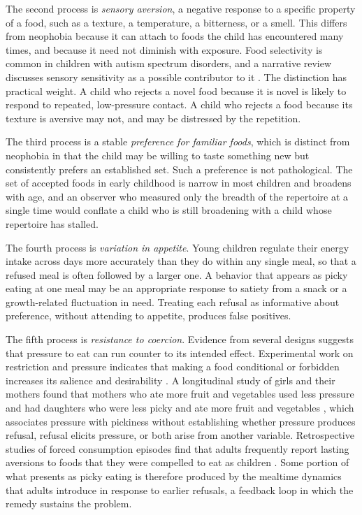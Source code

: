 \documentclass[11pt]{article}
\theoremstyle{remark}
\begin{document}
The second process is \emph{sensory aversion}, a negative response to a specific property of a food, such as a texture, a temperature, a bitterness, or a smell. This differs from neophobia because it can attach to foods the child has encountered many times, and because it need not diminish with exposure. Food selectivity is common in children with autism spectrum disorders, and a narrative review discusses sensory sensitivity as a possible contributor to it \citep{cermak2010food}. The distinction has practical weight. A child who rejects a novel food because it is novel is likely to respond to repeated, low-pressure contact. A child who rejects a food because its texture is aversive may not, and may be distressed by the repetition.

The third process is a stable \emph{preference for familiar foods}, which is distinct from neophobia in that the child may be willing to taste something new but consistently prefers an established set. Such a preference is not pathological. The set of accepted foods in early childhood is narrow in most children and broadens with age, and an observer who measured only the breadth of the repertoire at a single time would conflate a child who is still broadening with a child whose repertoire has stalled.

The fourth process is \emph{variation in appetite}. Young children regulate their energy intake across days more accurately than they do within any single meal, so that a refused meal is often followed by a larger one. A behavior that appears as picky eating at one meal may be an appropriate response to satiety from a snack or a growth-related fluctuation in need. Treating each refusal as informative about preference, without attending to appetite, produces false positives.

The fifth process is \emph{resistance to coercion}. Evidence from several designs suggests that pressure to eat can run counter to its intended effect. Experimental work on restriction and pressure indicates that making a food conditional or forbidden increases its salience and desirability \citep{fisher1999restricting}. A longitudinal study of girls and their mothers found that mothers who ate more fruit and vegetables used less pressure and had daughters who were less picky and ate more fruit and vegetables \citep{galloway2005parental}, which associates pressure with pickiness without establishing whether pressure produces refusal, refusal elicits pressure, or both arise from another variable. Retrospective studies of forced consumption episodes find that adults frequently report lasting aversions to foods that they were compelled to eat as children \citep{batsell2002you}. Some portion of what presents as picky eating is therefore produced by the mealtime dynamics that adults introduce in response to earlier refusals, a feedback loop in which the remedy sustains the problem.
\end{document}
